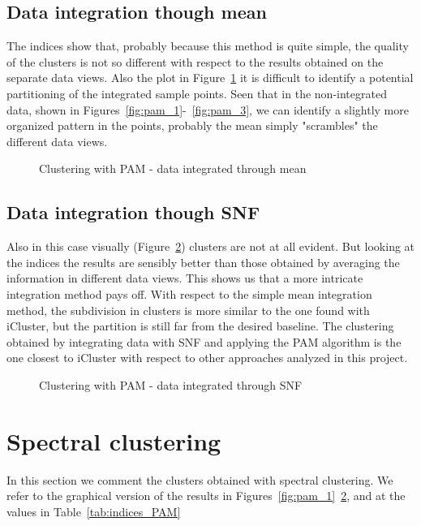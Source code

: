 \subsection*{Data integration though mean}\label{pam_mean}
The indices show that, probably because this method is quite simple, the quality of the clusters is not so different with respect to the results obtained on the separate data views. Also the plot in Figure~\ref{fig:pam_mean} it is difficult to identify a potential partitioning of the integrated sample points. Seen that in the non-integrated data, shown in Figures~\ref{fig:pam_1}-~\ref{fig:pam_3}, we can identify a slightly more organized pattern in the points, probably the mean simply "scrambles" the different data views.
\begin{figure}[!]\label{fig:pam_mean}
    \centering
    \caption{Clustering with PAM - data integrated through mean}
\end{figure}

\subsection*{Data integration though SNF}\label{pam_SNF}
Also in this case visually (Figure~\ref{fig:pam_SNF}) clusters are not at all evident. But looking at the indices the results are sensibly better than those obtained by averaging the information in different data views. This shows us that a more intricate integration method pays off. With respect to the simple mean integration method, the subdivision in clusters is more similar to the one found with iCluster, but the partition is still far from the desired baseline. The clustering obtained by integrating data with SNF and applying the PAM algorithm is the one closest to iCluster with respect to other approaches analyzed in this project.
\begin{figure}[!]\label{fig:pam_SNF}
    \centering
    \caption{Clustering with PAM - data integrated through SNF}
\end{figure}

\section{Spectral clustering}\label{results_sc}
In this section we comment the clusters obtained with spectral clustering. We refer to the graphical version of the results in Figures~\ref{fig:pam_1}~\ref{fig:pam_SNF}, and at the values in Table~\ref{tab:indices_PAM}

